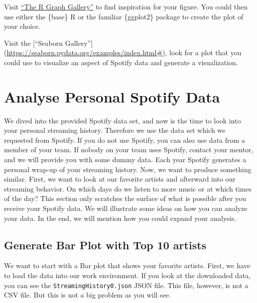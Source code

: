 \documentclass[
  11pt,
]{book}
\newenvironment{tips}[1]
  {
  \begin{itemize}
  \footnotesize
  \renewcommand{\labelitemi}{
    \raisebox{-.7\height}[0pt][0pt]{
      {\setkeys{Gin}{width=3em,keepaspectratio}
        \texttt{[image: images/\#1.png]}}
    }
  }
  \setlength{\fboxsep}{1em}
  \begin{rbox}
  \item
  }
  {
  \end{rbox}
  \end{itemize}
  }
\newenvironment{tipsp}[1]
  {
  \begin{itemize}
  \footnotesize
  \renewcommand{\labelitemi}{
    \raisebox{-.7\height}[0pt][0pt]{
      {\setkeys{Gin}{width=3em,keepaspectratio}
        \texttt{[image: images/\#1.png]}}
    }
  }
  \setlength{\fboxsep}{1em}
  \begin{pbox}
  \item
  }
  {
  \end{pbox}
  \end{itemize}
  }
\begin{document}
\begin{tips}r

Visit \href{https://www.r-graph-gallery.com/all-graphs}{``The R Graph Gallery''} to find inspiration for your figure. You could then use either the \{base\} R or the familiar \{ggplot2\} package to create the plot of your choice.

\end{tips}

\begin{tipsp}p

Visit the {[}``Seaborn Gallery''{]} (\url{https://seaborn.pydata.org/examples/index.html\#}), look for a plot that you could use to visualize an aspect of Spotify data and generate a visualization.

\end{tipsp}

\hypertarget{analyse-personal-spotify-data}{%
\section{Analyse Personal Spotify Data}\label{analyse-personal-spotify-data}}

We dived into the provided Spotify data set, and now is the time to look into your personal streaming history. Therefore we use the data set which we requested from Spotify.
If you do not use Spotify, you can also use data from a member of your team. If nobody on your team uses Spotify, contact your mentor, and we will provide you with some dummy data.
Each year Spotify generates a personal wrap-up of your streaming history. Now, we want to produce something similar. First, we want to look at our favorite artists and afterward into our streaming behavior. On which days do we listen to more music or at which times of the day?
This section only scratches the surface of what is possible after you receive your Spotify data. We will illustrate some ideas on how you can analyze your data. In the end, we will mention how you could expand your analysis.

\hypertarget{generate-bar-plot-with-top-10-artists}{%
\subsection{Generate Bar Plot with Top 10 artists}\label{generate-bar-plot-with-top-10-artists}}

We want to start with a Bar plot that shows your favorite artists.
First, we have to load the data into our work environment. If you look at the downloaded data, you can see the \texttt{StreamingHistory0.json} JSON file. This file, however, is not a CSV file. But this is not a big problem as you will see.
\end{document}
